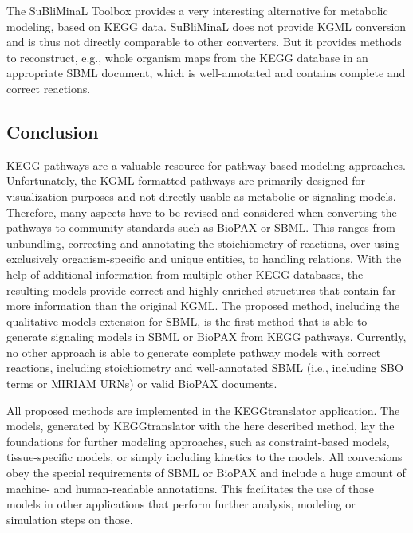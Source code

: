 \documentclass[10pt]{bmc_article}
\newenvironment{bmcformat}{\baselineskip20pt\sloppy\setboolean{publ}{false}}{\baselineskip20pt\sloppy}
\begin{document}
\begin{bmcformat}
The SuBliMinaL Toolbox \cite{SuBliMinaL} provides a very interesting alternative for metabolic modeling, based on KEGG data. SuBliMinaL does not provide KGML conversion and is thus not directly comparable to other converters. But it provides methods to reconstruct, e.g., whole organism maps from the KEGG database in an appropriate SBML document, which is well-annotated and contains complete and correct reactions.



\subsection*{Conclusion}

KEGG pathways are a valuable resource for pathway-based modeling approaches. Unfortunately, the KGML-formatted pathways are primarily designed for visualization purposes and not directly usable as metabolic or signaling models. Therefore, many aspects have to be revised and considered when converting the pathways to community standards such as BioPAX or SBML. This ranges from unbundling, correcting and annotating the stoichiometry of reactions, over using exclusively organism-specific and unique entities, to handling relations. With the help of additional information from multiple other KEGG databases, the resulting models provide correct and highly enriched structures that contain far more information than the original KGML.
%
The proposed method, including the qualitative models extension for SBML, is the first method that is able to generate signaling models in SBML or BioPAX from KEGG pathways. Currently, no other approach is able to generate complete pathway models with correct reactions, including stoichiometry and well-annotated SBML (i.e., including SBO terms or MIRIAM URNs) or valid BioPAX documents.

%
All proposed methods are implemented in the KEGGtranslator application. The models, generated by KEGGtranslator with the here described method, lay the foundations for further modeling approaches, such as constraint-based models, tissue-specific models, or simply including kinetics to the models. All conversions obey the special requirements of SBML or BioPAX and include a huge amount of machine- and human-readable annotations. This facilitates the use of those models in other applications that perform further analysis, modeling or simulation steps on those.
%



\bigskip


\end{bmcformat}
\end{document}

